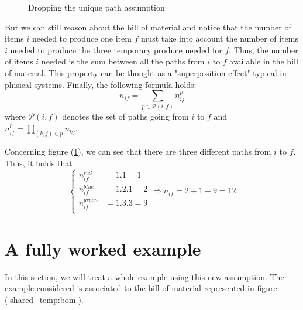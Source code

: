 \begin{figure}[h!]
{
    }
    \caption{\label{shared_temp:basic_bom}Dropping the unique path assumption}
\end{figure} %

But we can still reason about the bill of material and notice that the number of items $i$ needed to produce one item $f$ must take into account the number of items $i$ needed to produce the three temporary produce needed for $f$. Thus, the number of items $i$ needed is the sum between all the paths from $i$ to $f$ available in the bill of material. This property can be thought as a "superposition effect" typical in phisical systems. Finally, the following formula holds: \[ n_{if} = \sum_{ p \in\mathcal P(i,f)} n_{ij}^p \] where $\mathcal P(i,f)$ denotes the set of paths going from $i$ to $f$ and $n_{if}^p = \prod_{(k,j)\in p}n_{kj}$. 

Concerning figure (\ref{shared_temp:basic_bom}), we can see that there are three different paths from $i$ to $f$. Thus, it holds that
\[
    \begin{cases}
        n_{if}^{red} &= 1.1 = 1 \\
        n_{if}^{blue} &= 1.2.1 = 2 \\
        n_{if}^{green} &= 1.3.3=  9 \\
    \end{cases}
    \Rightarrow
    n_{if} = 2 + 1 + 9 = 12
\]

\section{A fully worked example}

In this section, we will treat a whole example using this new assumption. The example considered is associated to the bill of material represented in figure (\ref{shared_temp:bom}). 

